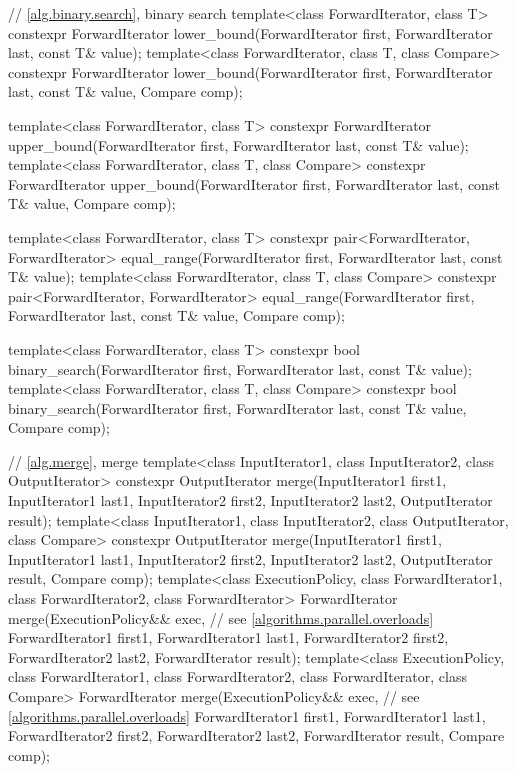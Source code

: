 \begin{codeblock}
{  // \ref{alg.binary.search}, binary search
  template<class ForwardIterator, class T>
    constexpr ForwardIterator
      lower_bound(ForwardIterator first, ForwardIterator last,
                  const T& value);
  template<class ForwardIterator, class T, class Compare>
    constexpr ForwardIterator
      lower_bound(ForwardIterator first, ForwardIterator last,
                  const T& value, Compare comp);

  template<class ForwardIterator, class T>
    constexpr ForwardIterator
      upper_bound(ForwardIterator first, ForwardIterator last,
                  const T& value);
  template<class ForwardIterator, class T, class Compare>
    constexpr ForwardIterator
      upper_bound(ForwardIterator first, ForwardIterator last,
                  const T& value, Compare comp);

  template<class ForwardIterator, class T>
    constexpr pair<ForwardIterator, ForwardIterator>
      equal_range(ForwardIterator first, ForwardIterator last,
                  const T& value);
  template<class ForwardIterator, class T, class Compare>
    constexpr pair<ForwardIterator, ForwardIterator>
      equal_range(ForwardIterator first, ForwardIterator last,
                  const T& value, Compare comp);

  template<class ForwardIterator, class T>
    constexpr bool
      binary_search(ForwardIterator first, ForwardIterator last,
                    const T& value);
  template<class ForwardIterator, class T, class Compare>
    constexpr bool
      binary_search(ForwardIterator first, ForwardIterator last,
                    const T& value, Compare comp);

  // \ref{alg.merge}, merge
  template<class InputIterator1, class InputIterator2, class OutputIterator>
    constexpr OutputIterator
      merge(InputIterator1 first1, InputIterator1 last1,
            InputIterator2 first2, InputIterator2 last2,
            OutputIterator result);
  template<class InputIterator1, class InputIterator2, class OutputIterator,
           class Compare>
    constexpr OutputIterator
      merge(InputIterator1 first1, InputIterator1 last1,
            InputIterator2 first2, InputIterator2 last2,
            OutputIterator result, Compare comp);
  template<class ExecutionPolicy, class ForwardIterator1, class ForwardIterator2,
           class ForwardIterator>
    ForwardIterator
      merge(ExecutionPolicy&& exec, // see \ref{algorithms.parallel.overloads}
            ForwardIterator1 first1, ForwardIterator1 last1,
            ForwardIterator2 first2, ForwardIterator2 last2,
            ForwardIterator result);
  template<class ExecutionPolicy, class ForwardIterator1, class ForwardIterator2,
           class ForwardIterator, class Compare>
    ForwardIterator
      merge(ExecutionPolicy&& exec, // see \ref{algorithms.parallel.overloads}
            ForwardIterator1 first1, ForwardIterator1 last1,
            ForwardIterator2 first2, ForwardIterator2 last2,
            ForwardIterator result, Compare comp);

}
\end{codeblock}
